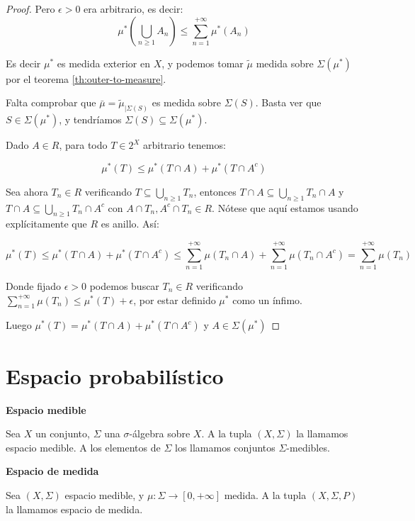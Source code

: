 \begin{proof}
 Pero $\epsilon > 0$ era arbitrario, es decir: 
 \[\mu^\ast \left(\bigcup_{n\ge 1} A_n \right) \le \sum_{n=1}^{+\infty}\mu^\ast(A_n)\]
 
 Es decir $\mu^\ast$ es medida exterior en $X$, y podemos tomar $\widetilde{\mu}$ medida sobre $\Sigma(\mu^\ast)$ por
 el teorema \ref{th:outer-to-measure}.
 
 Falta comprobar que $\bar{\mu} = \widetilde{\mu}_{|\Sigma(S)}$ es medida sobre $\Sigma(S)$. Basta ver que $S\in \Sigma(\mu^\ast)$,
 y tendríamos $\Sigma(S) \subseteq \Sigma(\mu^\ast)$.
 
 Dado $A\in R$, para todo $T\in 2^X$ arbitrario tenemos:
 
 \[\mu^\ast(T) \le \mu^\ast(T\cap A) + \mu^\ast(T\cap A^c)\]
 
 Sea ahora $T_n \in R$ verificando $T\subseteq \bigcup_{n\ge 1} T_n$, entonces 
 $T\cap A \subseteq \bigcup_{n\ge 1} T_n \cap A$ y $T\cap A \subseteq \bigcup_{n\ge 1} T_n \cap A^c$ con 
 $A\cap T_n, A^c \cap T_n \in R$. Nótese que aquí estamos usando explícitamente que $R$ es anillo. Así:
 
 \[\mu^\ast(T) \le \mu^\ast(T\cap A) + \mu^\ast(T\cap A^c) \le \sum_{n=1}^{+\infty}\mu(T_n \cap A) + 
 \sum_{n=1}^{+\infty} \mu(T_n \cap A^c) = \sum_{n=1}^{+\infty} \mu(T_n)\]
 
 Donde fijado $\epsilon > 0$ podemos buscar $T_n \in R$ verificando $\sum_{n=1}^{+\infty} \mu(T_n) \le \mu^\ast(T) + \epsilon$, 
 por estar definido $\mu^\ast$ como un ínfimo.
 
 Luego $\mu^\ast(T) = \mu^\ast(T\cap A) + \mu^\ast(T\cap A^c)$ y $A\in \Sigma(\mu^\ast)$
\end{proof}



\section{Espacio probabilístico}

\begin{definition} \textbf{Espacio medible}

 Sea $X$ un conjunto, $\Sigma$ una $\sigma$-álgebra sobre $X$. A la tupla $(X,\Sigma)$ la llamamos
 espacio medible. A los elementos de $\Sigma$ los llamamos conjuntos $\Sigma$-medibles.
\end{definition}


\begin{definition} \textbf{Espacio de medida}

 Sea $(X, \Sigma)$ espacio medible, y $\mu: \Sigma \rightarrow [0,+\infty]$ medida. A la tupla $(X, \Sigma, P)$ 
 la llamamos espacio de medida.
\end{definition}


